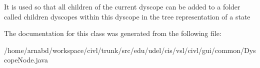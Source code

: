 It is used so that all children of the current dyscope can be added to a folder called children dyscopes within this dyscope in the tree representation of a state 

The documentation for this class was generated from the following file\+:\begin{DoxyCompactItemize}
\item 
/home/arnabd/workspace/civl/trunk/src/edu/udel/cis/vsl/civl/gui/common/Dyscope\+Node.\+java\end{DoxyCompactItemize}
